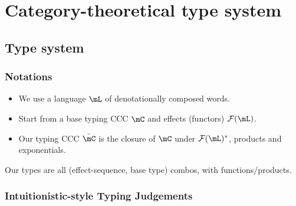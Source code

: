 \documentclass[math, english, info]{beamercours}
\begin{document}
\section{Category-theoretical type system}
\subsection{Type system}
\begin{frame}
	\frametitle{Notations}
	\begin{itemize}
		\item We use a language $\mL$ of denotationally composed words.
		\item Start from a base typing CCC $\mC$ and effects (functors) $\mathcal{F}(\mL)$.
		      \pause
		\item Our typing CCC $\bar{\mC}$ is the closure of $\mC$ under $\mathcal{F}(\mL)^{*}$, products and exponentials.
	\end{itemize}
	Our types are all (effect-sequence, base type) combos, with functions/products.
\end{frame}

\begin{frame}[fragile]
	\frametitle{Intuitionistic-style Typing Judgements}
\end{frame}
\end{document}

